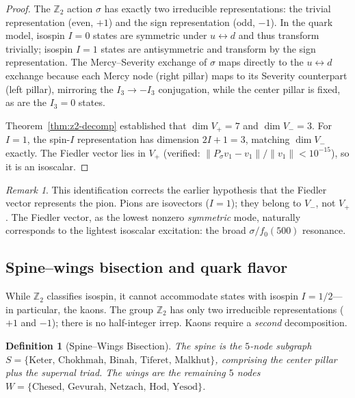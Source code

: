 \documentclass[11pt,a4paper]{amsart}
\newtheorem{definition}[theorem]{Definition}
\theoremstyle{remark}
\newtheorem{remark}[theorem]{Remark}
\newcommand{\bbZ}{\mathbb{Z}}
\begin{document}
\begin{proof}
The $\bbZ_2$ action $\sigma$ has exactly two irreducible representations:
the trivial representation (even, $+1$) and the sign representation
(odd, $-1$). In the quark model, isospin $I = 0$ states are symmetric under
$u \leftrightarrow d$ and thus transform trivially; isospin $I = 1$ states
are antisymmetric and transform by the sign representation. The
Mercy--Severity exchange of $\sigma$ maps directly to the
$u \leftrightarrow d$ exchange because each Mercy node (right pillar)
maps to its Severity counterpart (left pillar), mirroring the
$I_3 \to -I_3$ conjugation, while the center pillar is fixed, as are the
$I_3 = 0$ states.

Theorem~\ref{thm:z2-decomp} established that $\dim V_+ = 7$ and
$\dim V_- = 3$. For $I = 1$, the spin-$I$ representation has dimension
$2I + 1 = 3$, matching $\dim V_-$ exactly. The Fiedler vector lies in $V_+$
(verified: $\|P_\sigma v_1 - v_1\| / \|v_1\| < 10^{-15}$), so it is an
isoscalar.
\end{proof}

\begin{remark}
This identification corrects the earlier hypothesis that the Fiedler vector
represents the pion. Pions are isovectors ($I = 1$); they belong to $V_-$,
not $V_+$. The Fiedler vector, as the lowest nonzero \emph{symmetric} mode,
naturally corresponds to the lightest isoscalar excitation: the broad
$\sigma/f_0(500)$ resonance.
\end{remark}

\subsection{Spine--wings bisection and quark flavor}
\label{sec:spine-wings}

While $\bbZ_2$ classifies isospin, it cannot accommodate states with isospin
$I = 1/2$---in particular, the kaons. The group $\bbZ_2$ has only two
irreducible representations ($+1$ and $-1$); there is no half-integer
irrep. Kaons require a \emph{second} decomposition.

\begin{definition}[Spine--Wings Bisection]
\label{def:spine-wings}
The \emph{spine} is the $5$-node subgraph
$S = \{\text{Keter, Chokhmah, Binah, Tiferet, Malkhut}\}$, comprising the
center pillar plus the supernal triad. The \emph{wings} are the remaining
$5$ nodes $W = \{\text{Chesed, Gevurah, Netzach, Hod, Yesod}\}$.
\end{definition}
\end{document}
